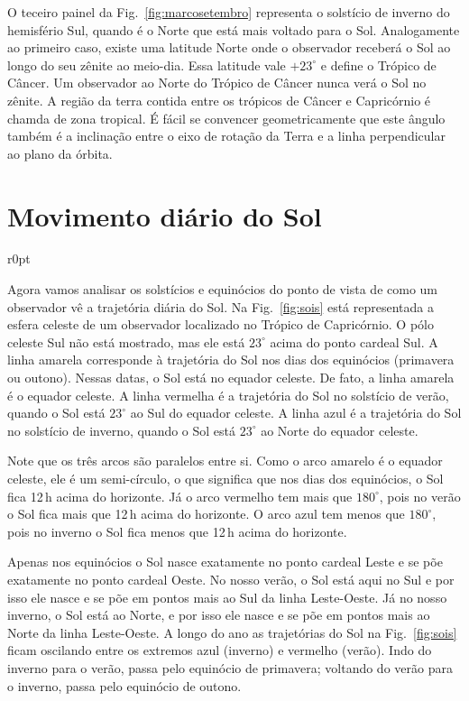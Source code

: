O teceiro painel da Fig.~\ref{fig:marcosetembro} representa o solstício de inverno do hemisfério Sul, quando é o Norte que está mais voltado para o Sol. Analogamente ao primeiro caso, existe uma latitude Norte onde o observador receberá o Sol ao longo do seu zênite ao meio-dia. Essa latitude vale $+23^{\circ}$ e define o Trópico de Câncer. Um observador ao Norte do Trópico de Câncer nunca verá o Sol no zênite. A região da terra contida entre os trópicos de Câncer e Capricórnio é chamda de zona tropical. É fácil se convencer geometricamente que este ângulo também é a inclinação entre o eixo de rotação da Terra e a linha perpendicular ao plano da órbita.

\section{Movimento diário do Sol}

\begin{wrapfigure}{r}{0pt}

\caption{Trajetórias do Sol no solstício de verão (vermelho), equinócios (amarelo) e solstício de inverno (azul).}
\label{fig:sois}
\end{wrapfigure}

Agora vamos analisar os solstícios e equinócios do ponto de vista de como um observador vê a trajetória diária do Sol. Na Fig.~\ref{fig:sois} está representada a esfera celeste de um observador localizado no Trópico de Capricórnio. O pólo celeste Sul não está mostrado, mas ele está $23^{\circ}$ acima do ponto cardeal Sul. A linha amarela corresponde à trajetória do Sol nos dias dos equinócios (primavera ou outono). Nessas datas, o Sol está no equador celeste. De fato, a linha amarela é o equador celeste. A linha vermelha é a trajetória do Sol no solstício de verão, quando o Sol está $23^{\circ}$ ao Sul do equador celeste. A linha azul é a trajetória do Sol no solstício de inverno, quando o Sol está $23^{\circ}$ ao Norte do equador celeste.

Note que os três arcos são paralelos entre si. Como o arco amarelo é o equador celeste, ele é um semi-círculo, o que significa que nos dias dos equinócios, o Sol fica 12\,h acima do horizonte. Já o arco vermelho tem mais que $180^{\circ}$, pois no verão o Sol fica mais que 12\,h acima do horizonte. O arco azul tem menos que $180^{\circ}$, pois no inverno o Sol fica menos que 12\,h acima do horizonte.

Apenas nos equinócios o Sol nasce exatamente no ponto cardeal Leste e se põe exatamente no ponto cardeal Oeste. No nosso verão, o Sol está aqui no Sul e por isso ele nasce e se põe em pontos mais ao Sul da linha Leste-Oeste. Já no nosso inverno, o Sol está ao Norte, e por isso ele nasce e se põe em pontos mais ao Norte da linha Leste-Oeste. A longo do ano as trajetórias do Sol na Fig.~\ref{fig:sois} ficam oscilando entre os extremos azul (inverno) e vermelho (verão). Indo do inverno para o verão, passa pelo equinócio de primavera; voltando do verão para o inverno, passa pelo equinócio de outono.

